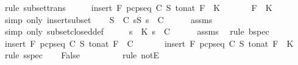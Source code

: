 \begin{isabellebody}
\ {\isacharparenleft}rule\ subset{\isacharunderscore}trans{\isacharparenright}\isanewline
\ \ \isamarkupfalse%
\ \isamarkupfalse%
\ {\isachardoublequoteopen}insert\ F\ {\isacharparenleft}pcp{\isacharunderscore}seq\ C\ S\ {\isacharparenleft}to{\isacharunderscore}nat\ F{\isacharparenright}{\isacharparenright}\ {\isasymsubseteq}\ K{\isachardoublequoteclose}\ \isanewline
\ \ \ \ \isamarkupfalse%
\ {\isacartoucheopen}F\ {\isasymin}\ K{\isacartoucheclose}\ \isamarkupfalse%
\ {\isacharparenleft}simp\ only{\isacharcolon}\ insert{\isacharunderscore}subset{\isacharparenright}\isanewline
\ \ \isamarkupfalse%
\ {\isachardoublequoteopen}{\isasymforall}S\ {\isasymin}\ C{\isachardot}\ {\isasymforall}s{\isasymsubseteq}S{\isachardot}\ s\ {\isasymin}\ C{\isachardoublequoteclose}\isanewline
\ \ \ \ \isamarkupfalse%
\ assms{\isacharparenleft}{}{\isacharparenright}\ \isamarkupfalse%
\ {\isacharparenleft}simp\ only{\isacharcolon}\ subset{\isacharunderscore}closed{\isacharunderscore}def{\isacharparenright}\isanewline
\ \ \isamarkupfalse%
\ \isamarkupfalse%
\ {\isachardoublequoteopen}{\isasymforall}s\ {\isasymsubseteq}\ K{\isachardot}\ s\ {\isasymin}\ C{\isachardoublequoteclose}\isanewline
\ \ \ \ \isamarkupfalse%
\ assms{\isacharparenleft}{}{\isacharparenright}\ \isamarkupfalse%
\ {\isacharparenleft}rule\ bspec{\isacharparenright}\isanewline
\ \ \isamarkupfalse%
\ \isamarkupfalse%
\ {}{\isacharcolon}{\isachardoublequoteopen}insert\ F\ {\isacharparenleft}pcp{\isacharunderscore}seq\ C\ S\ {\isacharparenleft}to{\isacharunderscore}nat\ F{\isacharparenright}{\isacharparenright}\ {\isasymin}\ C{\isachardoublequoteclose}\ \isanewline
\ \ \ \ \isamarkupfalse%
\ {\isacartoucheopen}insert\ F\ {\isacharparenleft}pcp{\isacharunderscore}seq\ C\ S\ {\isacharparenleft}to{\isacharunderscore}nat\ F{\isacharparenright}{\isacharparenright}\ {\isasymsubseteq}\ K{\isacartoucheclose}\ \isamarkupfalse%
\ {\isacharparenleft}rule\ sspec{\isacharparenright}\isanewline
\ \ \isamarkupfalse%
\ {\isachardoublequoteopen}False{\isachardoublequoteclose}\isanewline
\ \ \ \ \isamarkupfalse%
\ {}\ {}\ \isamarkupfalse%
\ {\isacharparenleft}rule\ notE{\isacharparenright}\isanewline
{}\isamarkupfalse%
%
\endisatagproof
{\isafoldproof}%
%
\isadelimproof

\end{isabellebody}
